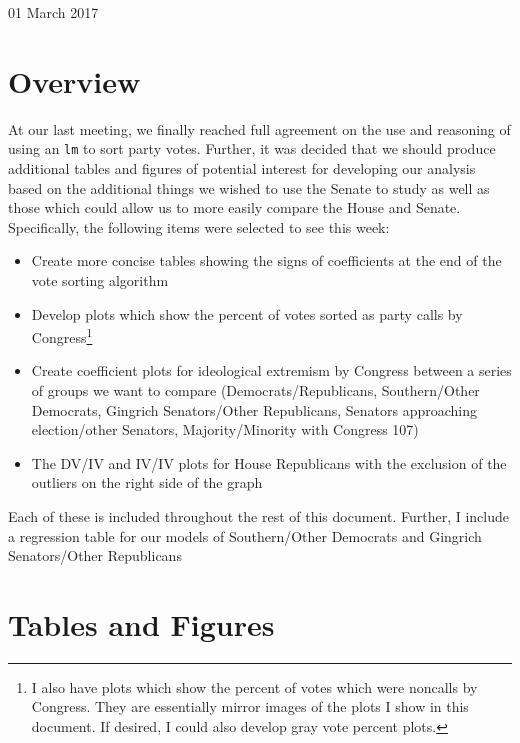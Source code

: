 \documentclass[12pt]{article}
\begin{document}
	
\begin{center}
	\Large 01 March 2017
\end{center}

\section{Overview}

At our last meeting, we finally reached full agreement on the use and reasoning of using an \verb|lm| to sort party votes. Further, it was decided that we should produce additional tables and figures of potential interest for developing our analysis based on the additional things we wished to use the Senate to study as well as those which could allow us to more easily compare the House and Senate. Specifically, the following items were selected to see this week:

\begin{itemize}
	\item Create more concise tables showing the signs of coefficients at the end of the vote sorting algorithm
	
	\item Develop plots which show the percent of votes sorted as party calls by Congress\footnote{I also have plots which show the percent of votes which were noncalls by Congress. They are essentially mirror images of the plots I show in this document. If desired, I could also develop gray vote percent plots.}
	
	\item Create coefficient plots for ideological extremism by Congress between a series of groups we want to compare (Democrats/Republicans, Southern/Other Democrats, Gingrich Senators/Other Republicans, Senators approaching election/other Senators, Majority/Minority with Congress 107)
	
	\item The DV/IV and IV/IV plots for House Republicans with the exclusion of the outliers on the right side of the graph
\end{itemize}

\noindent
Each of these is included throughout the rest of this document. Further, I include a regression table for our models of Southern/Other Democrats and Gingrich Senators/Other Republicans
	
\section{Tables and Figures}
	
\end{document}
